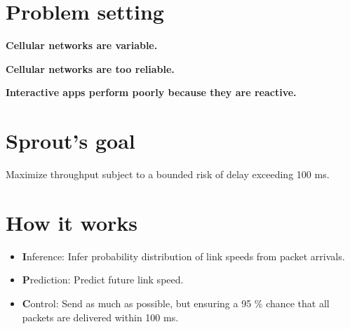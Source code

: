 \begin{multicols}{2}
\section*{Problem setting}
\begin{centering}
{\large \bf Cellular networks are variable.}
\begin{center}
\def\svgwidth{0.75\columnwidth}
\end{center}
\end{centering}

\begin{centering}
{\large \bf Cellular networks are too reliable.}
\begin{center}
{\bf \huge
\def\svgwidth{0.75\columnwidth}{\large }
}
\end{center}
\end{centering}

{\large \bf Interactive apps perform poorly because they are reactive.}

\section*{Sprout's goal}
{\large \bf
\begin{center}
Maximize throughput subject to a bounded risk of delay exceeding 100 ms.
\end{center}
}

\section*{How it works}
{\large \bf
\begin{itemize}
\item {\textbf Inference:} Infer probability distribution of link speeds from packet arrivals.
\item {\textbf Prediction:} Predict future link speed.
\item {\textbf Control:} Send as much as possible, but ensuring a 95 \% chance that all packets are delivered within 100 ms.
\end{itemize}
}
\begin{centering}
\def\svgwidth{0.85 \columnwidth}{\large }
\end{centering}


\end{multicols}
